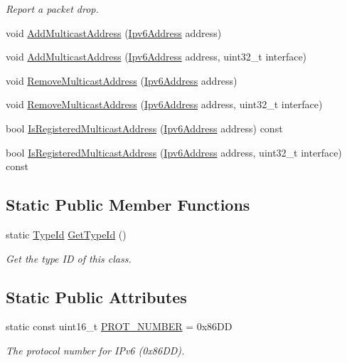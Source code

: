 \begin{DoxyCompactItemize}
\begin{DoxyCompactList}\small\item\em Report a packet drop. \end{DoxyCompactList}\item 
void \hyperlink{classns3_1_1Ipv6L3Protocol_a63db5954bff57ed45b1a6f1847949e11}{Add\+Multicast\+Address} (\hyperlink{classns3_1_1Ipv6Address}{Ipv6\+Address} address)
\item 
void \hyperlink{classns3_1_1Ipv6L3Protocol_aa1b596016a4983592469afcbcbc3be24}{Add\+Multicast\+Address} (\hyperlink{classns3_1_1Ipv6Address}{Ipv6\+Address} address, uint32\+\_\+t interface)
\item 
void \hyperlink{classns3_1_1Ipv6L3Protocol_a989f80923c9a36329391c932c66eb023}{Remove\+Multicast\+Address} (\hyperlink{classns3_1_1Ipv6Address}{Ipv6\+Address} address)
\item 
void \hyperlink{classns3_1_1Ipv6L3Protocol_a8d44abee229e1b89199fc7f1dec1919a}{Remove\+Multicast\+Address} (\hyperlink{classns3_1_1Ipv6Address}{Ipv6\+Address} address, uint32\+\_\+t interface)
\item 
bool \hyperlink{classns3_1_1Ipv6L3Protocol_ad883e42df23aa1fc0fe38a1489830b1a}{Is\+Registered\+Multicast\+Address} (\hyperlink{classns3_1_1Ipv6Address}{Ipv6\+Address} address) const 
\item 
bool \hyperlink{classns3_1_1Ipv6L3Protocol_a6c649bc2bafa7ef1c2a7ec9ef0674e2b}{Is\+Registered\+Multicast\+Address} (\hyperlink{classns3_1_1Ipv6Address}{Ipv6\+Address} address, uint32\+\_\+t interface) const 
\end{DoxyCompactItemize}
\subsection*{Static Public Member Functions}
\begin{DoxyCompactItemize}
\item 
static \hyperlink{classns3_1_1TypeId}{Type\+Id} \hyperlink{classns3_1_1Ipv6L3Protocol_afb1b9affe13b7f2c4ccc0923fa291e11}{Get\+Type\+Id} ()
\begin{DoxyCompactList}\small\item\em Get the type ID of this class. \end{DoxyCompactList}\end{DoxyCompactItemize}
\subsection*{Static Public Attributes}
\begin{DoxyCompactItemize}
\item 
static const uint16\+\_\+t \hyperlink{classns3_1_1Ipv6L3Protocol_ac44af6866e3ddd3f0cb9fbe228afdfe9}{P\+R\+O\+T\+\_\+\+N\+U\+M\+B\+ER} = 0x86\+DD
\begin{DoxyCompactList}\small\item\em The protocol number for I\+Pv6 (0x86\+DD). \end{DoxyCompactList}\end{DoxyCompactItemize}
